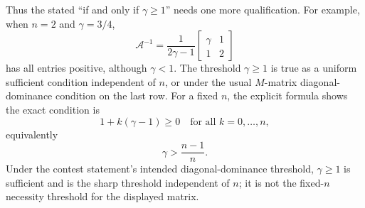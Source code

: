\begin{solution}
Thus the stated ``if and only if $\gamma\geq1$'' needs one more qualification.  For example, when $n=2$ and $\gamma=3/4$,
\[
\mathcal A^{-1}
=\frac{1}{2\gamma-1}
\begin{bmatrix}
\gamma&1\\
1&2
\end{bmatrix}
\]
has all entries positive, although $\gamma<1$.  The threshold $\gamma\geq1$ is true as a uniform sufficient condition independent of $n$, or under the usual $M$-matrix diagonal-dominance condition on the last row.  For a fixed $n$, the explicit formula shows the exact condition is
\[
1+k(\gamma-1)\geq0\quad\text{for all }k=0,\dots,n,
\]
equivalently
\[
\gamma>\frac{n-1}{n}.
\]
Under the contest statement's intended diagonal-dominance threshold, $\gamma\geq1$ is sufficient and is the sharp threshold independent of $n$; it is not the fixed-$n$ necessity threshold for the displayed matrix.
\end{solution}
